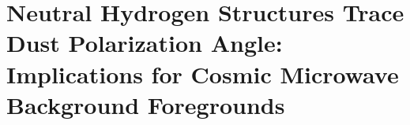 \chapter[Neutral Hydrogen Structures Trace Dust Polarization Angle: Implications for Cosmic Microwave Background Foregrounds]{Neutral Hydrogen Structures Trace Dust Polarization Angle: Implications for Cosmic Microwave Background Foregrounds\label{ch:foregrounds}}
\let\thefootnote\relax{}
